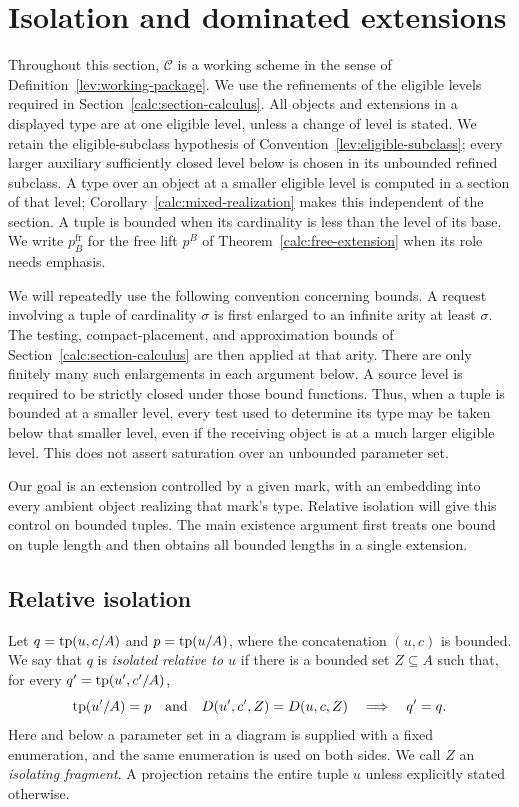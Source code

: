 \section{Isolation and dominated extensions}
\label{iso:section-isolation}

Throughout this section, $\mathcal C$ is a working scheme in the sense of
Definition~\ref{lev:working-package}. We use the refinements of the eligible
levels required in Section~\ref{calc:section-calculus}. All objects and
extensions in a displayed type are at one eligible level, unless a change of
level is stated. We retain the eligible-subclass hypothesis of
Convention~\ref{lev:eligible-subclass}; every larger auxiliary sufficiently
closed level below is chosen in its unbounded refined subclass.
A type over an object at a smaller eligible level is computed
in a section of that level; Corollary~\ref{calc:mixed-realization} makes this
independent of the section. A tuple is bounded when its cardinality is less
than the level of its base. We write $p^{\mathrm{fr}}_B$ for the free lift
$p^B$ of Theorem~\ref{calc:free-extension} when its role needs emphasis.

We will repeatedly use the following convention concerning bounds. A request
involving a tuple of cardinality $\sigma$ is first enlarged to an infinite
arity at least $\sigma$. The testing, compact-placement, and approximation
bounds of Section~\ref{calc:section-calculus} are then applied at that arity.
There are only finitely many such enlargements in each argument below. A
source level is required to be strictly closed under those bound functions.
Thus, when a tuple is bounded at a smaller level, every test used to determine
its type may be taken below that smaller level, even if the receiving object
is at a much larger eligible level. This does not assert saturation over an
unbounded parameter set.

Our goal is an extension controlled by a given mark, with an embedding
into every ambient object realizing that mark's type.  Relative isolation
will give this control on bounded tuples.  The main existence argument
first treats one bound on tuple length and then obtains all bounded
lengths in a single extension.

\subsection{Relative isolation}

\begin{definition}\label{iso:relative-isolation}
Let $q=\operatorname{tp}(u,c/A)$ and $p=\operatorname{tp}(u/A)$, where the concatenation $(u,c)$ is
bounded. We say that $q$ is \emph{isolated relative to $u$} if there is a
bounded set $Z\subseteq A$ such that, for every $q'=\operatorname{tp}(u',c'/A)$,
\[
 \operatorname{tp}(u'/A)=p\quad\text{and}\quad
 D(u',c',Z)=D(u,c,Z)
 \quad\Longrightarrow\quad q'=q.
\]
Here and below a parameter set in a diagram is supplied with a fixed
enumeration, and the same enumeration is used on both sides. We call $Z$ an
\emph{isolating fragment}. A projection retains the entire tuple $u$ unless
explicitly stated otherwise.
\end{definition}

